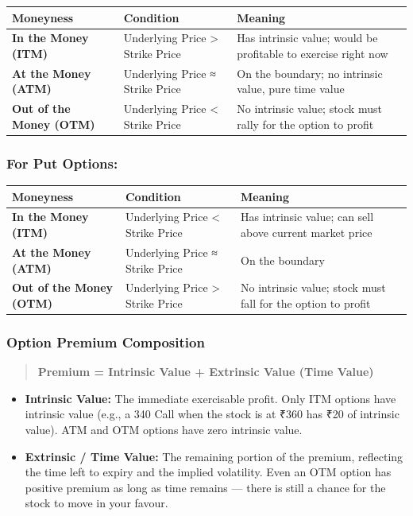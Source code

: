 \documentclass[12pt,openany]{book}
\begin{document}
\begin{center}
\scriptsize
\setlength{\tabcolsep}{3pt}
\begin{tabular}{|L{4.40cm}|L{4.40cm}|L{4.40cm}|}
\hline
Moneyness & Condition & Meaning \\
\hline
\textbf{In the Money (ITM)} & Underlying Price > Strike Price & Has intrinsic value; would be profitable to exercise right now \\
\hline
\textbf{At the Money (ATM)} & Underlying Price ≈ Strike Price & On the boundary; no intrinsic value, pure time value \\
\hline
\textbf{Out of the Money (OTM)} & Underlying Price < Strike Price & No intrinsic value; stock must rally for the option to profit \\
\hline
\end{tabular}
\end{center}

\subsubsection{For Put Options:}

\begin{center}
\scriptsize
\setlength{\tabcolsep}{3pt}
\begin{tabular}{|L{4.40cm}|L{4.40cm}|L{4.40cm}|}
\hline
Moneyness & Condition & Meaning \\
\hline
\textbf{In the Money (ITM)} & Underlying Price < Strike Price & Has intrinsic value; can sell above current market price \\
\hline
\textbf{At the Money (ATM)} & Underlying Price ≈ Strike Price & On the boundary \\
\hline
\textbf{Out of the Money (OTM)} & Underlying Price > Strike Price & No intrinsic value; stock must fall for the option to profit \\
\hline
\end{tabular}
\end{center}

\subsubsection{Option Premium Composition}

\begin{quote}
\textbf{Premium = Intrinsic Value + Extrinsic Value (Time Value)}
\end{quote}

\begin{itemize}[leftmargin=*]
    \item \textbf{Intrinsic Value:} The immediate exercisable profit. Only ITM options have intrinsic value (e.g., a 340 Call when the stock is at ₹360 has ₹20 of intrinsic value). ATM and OTM options have zero intrinsic value.
    \item \textbf{Extrinsic / Time Value:} The remaining portion of the premium, reflecting the time left to expiry and the implied volatility. Even an OTM option has positive premium as long as time remains — there is still a chance for the stock to move in your favour.
\end{itemize}
\end{document}
